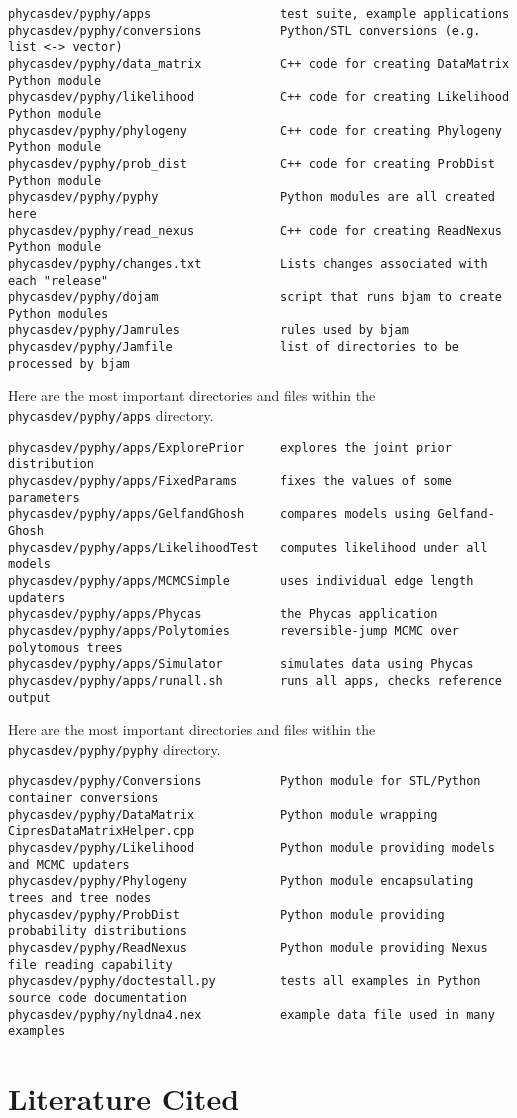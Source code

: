 \documentclass[10pt]{article}
\begin{document}
\begin{verbatim}
phycasdev/pyphy/apps                  test suite, example applications
phycasdev/pyphy/conversions           Python/STL conversions (e.g. list <-> vector)
phycasdev/pyphy/data_matrix           C++ code for creating DataMatrix Python module
phycasdev/pyphy/likelihood            C++ code for creating Likelihood Python module
phycasdev/pyphy/phylogeny             C++ code for creating Phylogeny Python module
phycasdev/pyphy/prob_dist             C++ code for creating ProbDist Python module
phycasdev/pyphy/pyphy                 Python modules are all created here
phycasdev/pyphy/read_nexus            C++ code for creating ReadNexus Python module
phycasdev/pyphy/changes.txt           Lists changes associated with each "release"
phycasdev/pyphy/dojam                 script that runs bjam to create Python modules
phycasdev/pyphy/Jamrules              rules used by bjam
phycasdev/pyphy/Jamfile               list of directories to be processed by bjam
\end{verbatim}

Here are the most important directories and files within the {\tt phycasdev/pyphy/apps} directory.

\begin{verbatim}
phycasdev/pyphy/apps/ExplorePrior     explores the joint prior distribution
phycasdev/pyphy/apps/FixedParams      fixes the values of some parameters
phycasdev/pyphy/apps/GelfandGhosh     compares models using Gelfand-Ghosh
phycasdev/pyphy/apps/LikelihoodTest   computes likelihood under all models
phycasdev/pyphy/apps/MCMCSimple       uses individual edge length updaters
phycasdev/pyphy/apps/Phycas           the Phycas application
phycasdev/pyphy/apps/Polytomies       reversible-jump MCMC over polytomous trees
phycasdev/pyphy/apps/Simulator        simulates data using Phycas
phycasdev/pyphy/apps/runall.sh        runs all apps, checks reference output
\end{verbatim}

Here are the most important directories and files within the {\tt phycasdev/pyphy/pyphy} directory.

\begin{verbatim}
phycasdev/pyphy/Conversions           Python module for STL/Python container conversions
phycasdev/pyphy/DataMatrix            Python module wrapping CipresDataMatrixHelper.cpp 
phycasdev/pyphy/Likelihood            Python module providing models and MCMC updaters
phycasdev/pyphy/Phylogeny             Python module encapsulating trees and tree nodes
phycasdev/pyphy/ProbDist              Python module providing probability distributions
phycasdev/pyphy/ReadNexus             Python module providing Nexus file reading capability
phycasdev/pyphy/doctestall.py         tests all examples in Python source code documentation
phycasdev/pyphy/nyldna4.nex           example data file used in many examples
\end{verbatim}

%
%

\section{Literature Cited}
\renewcommand{\bibsection}{}

\end{document}
